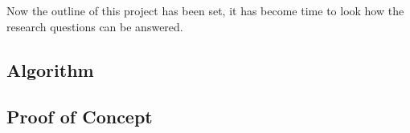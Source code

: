 

Now the outline of this project has been set, it has become time to look how the research questions can be answered. 

\subsection{Algorithm}


\subsection{Proof of Concept}

